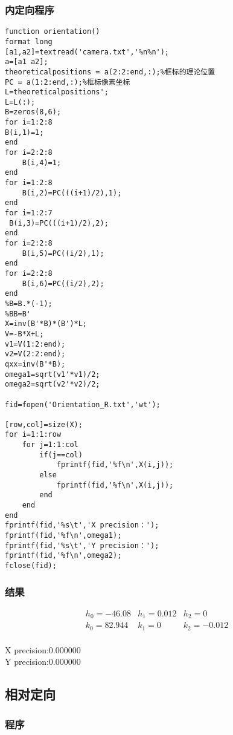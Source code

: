 \subsubsection{内定向程序}


\begin{lstlisting}[caption=oriention.m]
function orientation()
format long
[a1,a2]=textread('camera.txt','%n%n');
a=[a1 a2];
theoreticalpositions = a(2:2:end,:);%框标的理论位置
PC = a(1:2:end,:);%框标像素坐标
L=theoreticalpositions';
L=L(:);
B=zeros(8,6);
for i=1:2:8
B(i,1)=1;
end
for i=2:2:8
    B(i,4)=1;
end
for i=1:2:8
    B(i,2)=PC(((i+1)/2),1);
end
for i=1:2:7
 B(i,3)=PC(((i+1)/2),2);
end
for i=2:2:8
    B(i,5)=PC((i/2),1);
end
for i=2:2:8
    B(i,6)=PC((i/2),2);
end
%B=B.*(-1);
%BB=B'
X=inv(B'*B)*(B')*L;
V=-B*X+L;
v1=V(1:2:end);
v2=V(2:2:end);
qxx=inv(B'*B);
omega1=sqrt(v1'*v1)/2;
omega2=sqrt(v2'*v2)/2;

fid=fopen('Orientation_R.txt','wt');

[row,col]=size(X);
for i=1:1:row
    for j=1:1:col
        if(j==col)
            fprintf(fid,'%f\n',X(i,j));
        else
            fprintf(fid,'%f\n',X(i,j));
        end
    end
end
fprintf(fid,'%s\t','X precision：');
fprintf(fid,'%f\n',omega1);
fprintf(fid,'%s\t','Y precision：');
fprintf(fid,'%f\n',omega2);
fclose(fid);
\end{lstlisting}

\subsubsection{结果}
\begin{equation}
\begin{array}{lll}
h_0=-46.08 & h_1=0.012 & h_2=0 \\
k_0=82.944 & k_1=0 & k_2=-0.012\\
\end{array}
\end{equation}

X precision:0.000000\\
Y precision:0.000000

\subsection{相对定向}
\subsubsection{程序}

